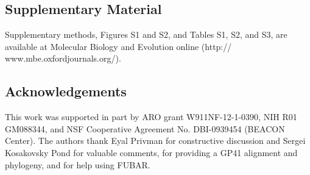 \documentclass[11pt]{article}
\begin{document}
\subsection*{Supplementary Material}
Supplementary methods, Figures S1 and S2, and Tables S1, S2, and S3, are available at Molecular Biology and Evolution online (http:// www.mbe.oxfordjournals.org/).


\subsection*{Acknowledgements}
 This work was supported in part by ARO grant W911NF-12-1-0390, NIH R01 GM088344, and NSF Cooperative Agreement No. DBI-0939454 (BEACON Center). The authors thank Eyal Privman for constructive discussion and Sergei Kosakovsky Pond for valuable  comments, for providing a GP41 alignment and phylogeny, and for help using FUBAR.



	

\newpage
\end{document}
